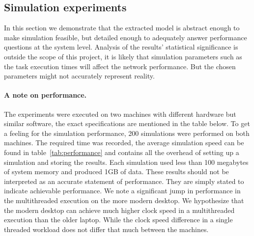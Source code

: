 \clearpage
\subsection{Simulation experiments}
\label{sec:experiments}
In this section we demonstrate that the extracted model is abstract enough to make simulation feasible, but detailed enough to adequately answer performance questions at the system level. Analysis of the results' statistical significance is outside the scope of this project, it is likely that simulation parameters such as the task execution times will affect the network performance. But the chosen parameters might not accurately represent reality. 

\paragraph{A note on performance.} The experiments were executed on two machines with different hardware but similar software, the exact specifications are mentioned in the table below. To get a feeling for the simulation performance, 200 simulations were performed on both machines. The required time was recorded, the average simulation speed can be found in table~\ref{tab:performance} and contains all the overhead of setting up a simulation and storing the results. Each simulation used less than 100 megabytes of system memory and produced 1GB of data. These results should not be interpreted as an accurate statement of performance. They are simply stated to indicate achievable performance. We note a significant jump in performance in the multithreaded execution on the more modern desktop. We hypothesize that the modern desktop can achieve much higher clock speed in a multithreaded execution than the older laptop. While the clock speed difference in a single threaded workload does not differ that much between the machines.
